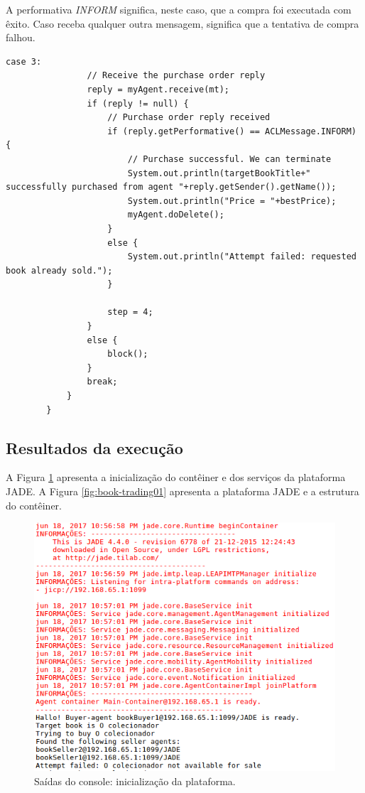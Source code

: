 A performativa \textit{INFORM} significa, neste caso, que a compra foi executada com êxito. Caso receba qualquer outra mensagem, significa que a tentativa de compra falhou.

\begin{lstlisting}[firstnumber=159]
			case 3:      
				// Receive the purchase order reply
				reply = myAgent.receive(mt);
				if (reply != null) {
					// Purchase order reply received
					if (reply.getPerformative() == ACLMessage.INFORM) {
						// Purchase successful. We can terminate
						System.out.println(targetBookTitle+" successfully purchased from agent "+reply.getSender().getName());
						System.out.println("Price = "+bestPrice);
						myAgent.doDelete();
					}
					else {
						System.out.println("Attempt failed: requested book already sold.");
					}

					step = 4;
				}
				else {
					block();
				}
				break;
			}        
		}
\end{lstlisting}


\subsection{Resultados da execução}


A Figura \ref{fig:book-trading00} apresenta a inicialização do contêiner e dos serviços da plataforma JADE. A Figura \ref{fig:book-trading01} apresenta a plataforma JADE e a estrutura do contêiner. 


\begin{figure}[h]
\centering
\includegraphics[scale=0.6]{figuras/contract-net/book-trading00}
\caption{Saídas do console: inicialização da plataforma.}
\label{fig:book-trading00}
\end{figure}

